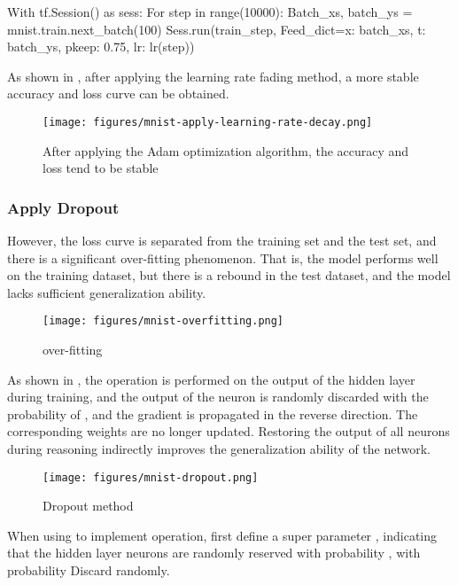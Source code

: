\begin{content}
\begin{content}
\begin{leftbar}
\begin{python}
With tf.Session() as sess:
  For step in range(10000):
    Batch_xs, batch_ys = mnist.train.next_batch(100)
    Sess.run(train_step, 
      Feed_dict={x: batch_xs, t: batch_ys, pkeep: 0.75, lr: lr(step)})
\end{python}
\end{leftbar}

As shown in , after applying the learning rate fading method, a more stable accuracy and loss curve can be obtained.

\begin{figure}[H]
\centering
\texttt{[image: figures/mnist-apply-learning-rate-decay.png]}
\caption{After applying the Adam optimization algorithm, the accuracy and loss tend to be stable}
 \label{fig:mnist-apply-learning-rate-decay}
\end{figure}

\subsubsection{Apply Dropout}

However, the loss curve is separated from the training set and the test set, and there is a significant over-fitting phenomenon. That is, the model performs well on the training dataset, but there is a rebound in the test dataset, and the model lacks sufficient generalization ability.

\begin{figure}[H]
\centering
\texttt{[image: figures/mnist-overfitting.png]}
\caption{over-fitting}
 \label{fig:mnist-overfitting}
\end{figure}

As shown in , the  operation is performed on the output of the hidden layer during training, and the output of the neuron is randomly discarded with the probability of , and the gradient is propagated in the reverse direction. The corresponding weights are no longer updated. Restoring the output of all neurons during reasoning indirectly improves the generalization ability of the network.

\begin{figure}[H]
\centering
\texttt{[image: figures/mnist-dropout.png]}
\caption{Dropout method}
 \label{fig:mnist-dropout}
\end{figure}

When using \tf{} to implement  operation, first define a super parameter , indicating that the hidden layer neurons are randomly reserved with probability , with probability  Discard randomly.


\end{content}
\end{content}
